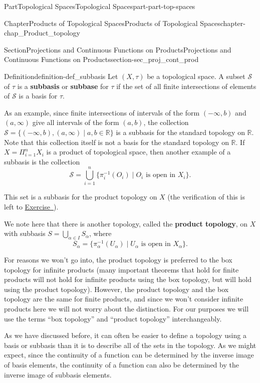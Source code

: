 \documentclass[oneside,10pt,]{book}
\newcommand{\xreffont}{\relax}
\newcommand{\terminology}[1]{\textbf{#1}}
\numberwithin{equation}{chapter}
\newcommand{\R}{\mathbb{R}}
\newcommand{\CS}{\mathcal{S}}
\begin{document}
\begin{partptx}{Part}{Topological Spaces}{}{Topological Spaces}{}{}{part-part-top-spaces}
\begin{chapterptx}{Chapter}{Products of Topological Spaces}{}{Products of Topological Spaces}{}{}{chapter-chap_Product_topology}
\begin{sectionptx}{Section}{Projections and Continuous Functions on Products}{}{Projections and Continuous Functions on Products}{}{}{section-sec_proj_cont_prod}
\begin{definition}{Definition}{}{definition-def_subbasis}%
%
%
Let \((X, \tau)\) be a topological space. A subset \(\CS\) of \(\tau\) is a \terminology{subbasis} or \terminology{subbase} for \(\tau\) if the set of all finite intersections of elements of \(\CS\) is a basis for \(\tau\).%
\end{definition}
As an example, since finite intersections of intervals of the form \((-\infty,b)\) and \((a, \infty)\) give all intervals of the form \((a,b)\), the collection \(\CS = \{(-\infty,b), (a, \infty) \mid a, b \in \R\}\) is a subbasis for the standard topology on \(\R\). Note that this collection itself is not a basis for the standard topology on \(\R\). If \(X = \Pi_{i=1}^n X_i\) is a product of topological space, then another example of a subbasis is the collection%
\begin{equation*}
\CS = \bigcup_{i=1}^n \{\pi_i^{-1}(O_i) \mid O_i \text{ is open in }  X_i\}\text{.}
\end{equation*}
%
\par
This set is a subbasis for the product topology on \(X\) (the verification of this is left to \hyperlink{exercise-ex_subbasis}{Exercise~{\xreffont 1}}).%
\par
{} We note here that there is another topology, called the \terminology{product topology}, on \(X\) with subbasis \(S = \bigcup_{\alpha \in I} S_{\alpha}\), where%
\begin{equation*}
S_{\alpha} = \{\pi_{\alpha}^{-1}(U_{\alpha}) \mid U_{\alpha} \text{ is open in } X_{\alpha}\}\text{.}
\end{equation*}
%
\par
For reasons we won't go into, the product topology is preferred to the box topology for infinite products (many important theorems that hold for finite products will not hold for infinite products using the box topology, but will hold using the product topology). However, the product topology and the box topology are the same for finite products, and since we won't consider infinite products here we will not worry about the distinction. For our purposes we will use the terms ``box topology'' and ``product topology'' interchangeably.%
\par
As we have discussed before, it can often be easier to define a topology using a basis or subbasis than it is to describe all of the sets in the topology. As we might expect, since the continuity of a function can be determined by the inverse image of basis elements, the continuity of a function can also be determined by the inverse image of subbasis elements.%

\end{sectionptx}
\end{chapterptx}
\end{partptx}
\end{document}
